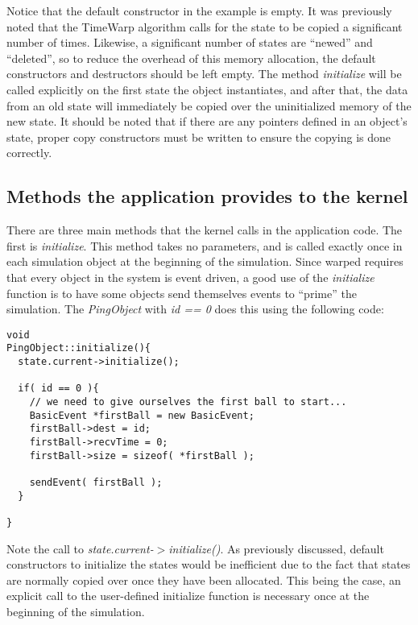\documentclass[11pt]{report}
\begin{document}
Notice that the default constructor in the example is empty.  It was
previously noted that the TimeWarp algorithm calls for the state to be
copied a significant number of times.  Likewise, a significant number of
states are ``newed'' and ``deleted'', so to reduce the overhead of this
memory allocation, the default constructors and destructors should be
left empty.  The method {\it initialize} will be called explicitly on
the first state the object instantiates, and after that, the data from
an old state will immediately be copied over the uninitialized memory of
the new state.  It should be noted that if there are any pointers
defined in an object's state, proper copy constructors must be written
to ensure the copying is done correctly.

\subsection{Methods the application provides to the kernel}

There are three main methods that the kernel calls in the application
code.  The first is {\it initialize}.  This method takes no parameters,
and is called exactly once in each simulation object at the beginning of
the simulation.  Since {\sc warped} requires that every object in the
system is event driven, a good use of the {\it initialize} function is
to have some objects send themselves events to ``prime'' the simulation.
The {\it PingObject} with {\it id == 0} does this using the following
code:

\begin{verbatim}
void  
PingObject::initialize(){
  state.current->initialize();

  if( id == 0 ){
    // we need to give ourselves the first ball to start...
    BasicEvent *firstBall = new BasicEvent;
    firstBall->dest = id;
    firstBall->recvTime = 0;
    firstBall->size = sizeof( *firstBall );
    
    sendEvent( firstBall );
  }
  
}

\end{verbatim}

Note the call to {\it state.current-$>$initialize()}.  As previously
discussed, default constructors to initialize the states would be
inefficient due to the fact that states are normally copied over once
they have been allocated.  This being the case, an explicit call to the
user-defined initialize function is necessary once at the beginning of
the simulation.
\end{document}
